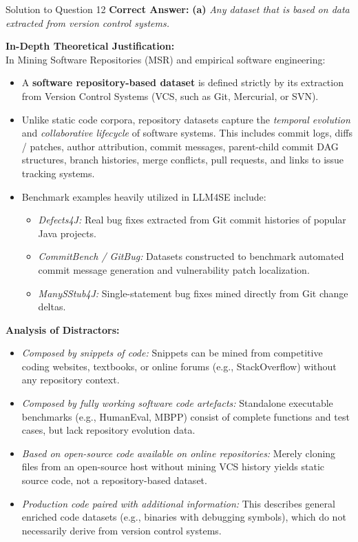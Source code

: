 \documentclass[11pt,a4paper]{article}
\begin{document}
\begin{solutionbox}{Solution to Question 12}
\textbf{Correct Answer:} \textbf{(a)} \textit{Any dataset that is based on data extracted from version control systems.}

\medskip
\textbf{In-Depth Theoretical Justification:}\\
In Mining Software Repositories (MSR) and empirical software engineering:
\begin{itemize}
    \item A \textbf{software repository-based dataset} is defined strictly by its extraction from Version Control Systems (VCS, such as Git, Mercurial, or SVN). 
    \item Unlike static code corpora, repository datasets capture the \textit{temporal evolution} and \textit{collaborative lifecycle} of software systems. This includes commit logs, diffs / patches, author attribution, commit messages, parent-child commit DAG structures, branch histories, merge conflicts, pull requests, and links to issue tracking systems.
    \item Benchmark examples heavily utilized in LLM4SE include:
    \begin{itemize}
        \item \textit{Defects4J:} Real bug fixes extracted from Git commit histories of popular Java projects.
        \item \textit{CommitBench / GitBug:} Datasets constructed to benchmark automated commit message generation and vulnerability patch localization.
        \item \textit{ManySStub4J:} Single-statement bug fixes mined directly from Git change deltas.
    \end{itemize}
\end{itemize}

\medskip
\textbf{Analysis of Distractors:}
\begin{itemize}[leftmargin=1.5cm]
    \item[\textbf{(b)}] \textit{Composed by snippets of code:} Snippets can be mined from competitive coding websites, textbooks, or online forums (e.g., StackOverflow) without any repository context.
    \item[\textbf{(c)}] \textit{Composed by fully working software code artefacts:} Standalone executable benchmarks (e.g., HumanEval, MBPP) consist of complete functions and test cases, but lack repository evolution data.
    \item[\textbf{(d)}] \textit{Based on open-source code available on online repositories:} Merely cloning files from an open-source host without mining VCS history yields static source code, not a repository-based dataset.
    \item[\textbf{(e)}] \textit{Production code paired with additional information:} This describes general enriched code datasets (e.g., binaries with debugging symbols), which do not necessarily derive from version control systems.
\end{itemize}
\end{solutionbox}
\end{document}
